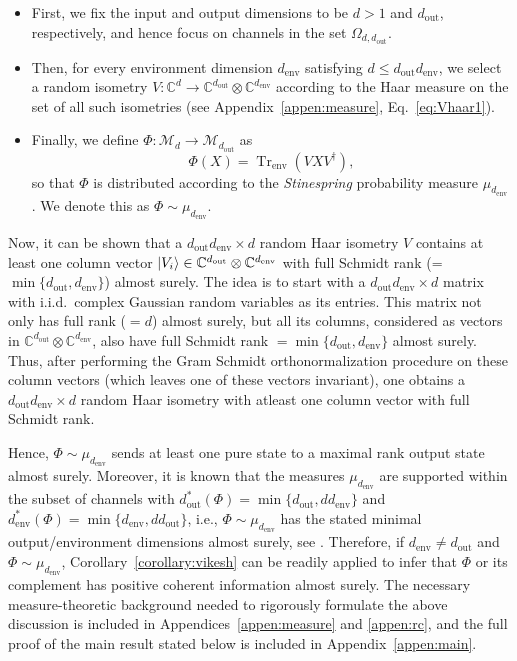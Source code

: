 \documentclass[a4paper,onecolumn,10pt,accepted=2022-07-11]{quantumarticle}
\newcommand{\M}[1]{\mathcal{M}_{#1}}
\newcommand{\C}[1]{\mathbb{C}^{#1}}
\newcommand{\env}{\operatorname{env}}
\newcommand{\out}{\operatorname{out}}
\theoremstyle{definition}
\begin{document}
\begin{itemize}
    \item First, we fix the input and output dimensions to be $d>1$ and $d_{\out}$, respectively, 
    and hence focus on channels in the set $\Omega_{d,d_{\out}}$.
    \item Then, for every environment dimension $d_{\env}$ satisfying $d\leq d_{\out}d_{\env}$, we select a random isometry $V:\C{d}\to \C{d_{\out}}\otimes \C{d_{\env}}$ according to the Haar measure on the set of all such isometries (see Appendix~\ref{appen:measure}, Eq.~\eqref{eq:Vhaar1}).
    \item Finally, we define $\Phi:\M{d}\to \M{d_{\out}}$ as
\begin{equation}
    \Phi (X) = \operatorname{Tr}_{\env}(VXV^\dagger),
\end{equation}
so that $\Phi$ is distributed according to the \emph{Stinespring} probability measure $\mu_{d_{\env}}$. We denote this as $\Phi\sim \mu_{d_{\env}}$.
\end{itemize}
 
Now, it can be shown that a $d_{\out} d_{\env}\times d$ random Haar isometry $V$ contains at least one column vector $\ket{V_i}\in\C{d_{\out}}\otimes \C{d_{\env}}$ with full Schmidt rank (= $\min\{d_{\out},d_{\env}\}$) almost surely. The idea is to start with a $d_{\out}d_{\env}\times d$ matrix with i.i.d.~complex Gaussian random variables as its entries. This matrix not only has full rank ($=d$) almost surely, but all its columns, considered as vectors in $\C{d_{\out}}\otimes \C{d_{\env}}$, also have full Schmidt rank $=\min\{d_{\out},d_{\env}\}$ almost surely. Thus, after performing the Gram Schmidt orthonormalization procedure on these column vectors (which leaves one of these vectors invariant), one obtains a $d_{\out} d_{\env}\times d$ random Haar isometry with atleast one column vector with full Schmidt rank.

Hence, $\Phi\sim \mu_{d_{\env}}$ sends at least one pure state to a maximal rank output state almost surely. Moreover, it is known that the measures $\mu_{d_{\env}}$ are supported within the subset of channels with $d^*_{\out}(\Phi)=\min\{d_{\out},dd_{\env}\}$ and $d^*_{\env}(\Phi)=\min\{d_{\env},dd_{\out}\}$, i.e., $\Phi\sim \mu_{d_{\env}}$ has the stated minimal output/environment dimensions almost surely, see \cite[Section 3]{kukulski2021generating}. Therefore, if $d_{\env}\neq d_{\out}$ and $\Phi\sim \mu_{d_{\env}}$, Corollary~\ref{corollary:vikesh} can be readily applied to infer that $\Phi$ or its complement has positive coherent information almost surely. The necessary measure-theoretic background needed to rigorously formulate the above discussion is included in Appendices~\ref{appen:measure} and \ref{appen:rc}, and the full proof of the main result stated below is included in Appendix~\ref{appen:main}.
\end{document}
